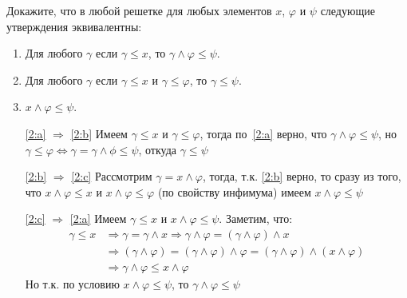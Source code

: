 \begin{task}[2]
	Докажите, что в любой решетке для любых элементов $x$, $\varphi$ и $\psi$ следующие утверждения эквивалентны:
	\begin{enumerate}
		\item \label{2:a} Для любого $\gamma$ если $\gamma \leq x$, то $\gamma \land \varphi \leq \psi$.
		\item \label{2:b} Для любого $\gamma$ если $\gamma \leq x$ и $\gamma \leq \varphi$, то $\gamma \leq \psi$.
		\item \label{2:c} $x \land \varphi \leq \psi$.
	\end{enumerate}
\end{task}
\begin{solution}
\begin{itemize}
	\item[\ref{2:a} $\Rightarrow$ \ref{2:b}] Имеем $\gamma \leq x$ и $\gamma \leq \varphi$, тогда по~\ref{2:a} верно, что $\gamma \land \varphi \leq \psi$, но $\gamma \leq \varphi \Leftrightarrow \gamma = \gamma \land \phi \leq \psi$, откуда $\gamma \leq \psi$ \xqed 
	\item[\ref{2:b} $\Rightarrow$ \ref{2:c}] Рассмотрим $\gamma = x \land \varphi$, тогда, т.к. \ref{2:b} верно, то сразу из того, что $x \land \varphi \leq x$ и $x \land \varphi \leq \varphi$ (по свойству инфимума) имеем $x \land \varphi \leq \psi$ \xqed
	\item[\ref{2:c} $\Rightarrow$ \ref{2:a}] Имеем $\gamma \leq x$ и $x \land \varphi \leq \psi$. Заметим, что:
	\begin{align*}
		\gamma \leq x &\Rightarrow \gamma = \gamma \land x \Rightarrow \gamma \land \varphi = (\gamma \land \varphi) \land x \\
					  &\Rightarrow (\gamma \land \varphi) = (\gamma \land \varphi) \land \varphi = (\gamma \land \varphi) \land (x \land \varphi)\\
					  &\Rightarrow \gamma \land \varphi \leq x \land \varphi
	\end{align*}
	Но т.к. по условию $x \land \varphi \leq \psi$, то $\gamma \land \varphi \leq \psi$ \xqed
\end{itemize}
\end{solution}

